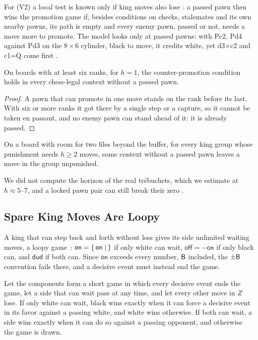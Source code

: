 For (V2) a local test is known only if king moves also lose : a passed pawn then wins the promotion
game if, besides conditions on checks, stalemates and its own nearby pawns, its path is empty and every enemy
pawn, passed or not, needs a move more to promote. The model looks only at passed pawns: with Pc2, Pd4 against
Pd3 on the $8\times6$ cylinder, black to move, it credits white, yet d3$\times$c2 and c1=Q come first .

\begin{proposition}[\lab{S}]\label{prop:horizon1}
On boards with at least six ranks, for $h=1$, the counter-promotion condition holds in every chess-legal
context without a passed pawn.
\end{proposition}

\begin{proof}
A pawn that can promote in one move stands on the rank before its last. With six or more ranks it got there by a
single step or a capture, so it cannot be taken en passant, and no enemy pawn can stand ahead of it: it is
already passed.
\end{proof}

\begin{conjecture}\label{conj:horizon2}
On a board with room for two files beyond the buffer, for every king group whose punishment needs $h\ge2$
moves, some context without a passed pawn leaves a move in the group unpunished.
\end{conjecture}

We did not compute the horizon of the real tr\'ebuchets, which we estimate at $h\approx5$--$7$, and a locked pawn pair can still break their zero .

\subsection{Spare King Moves Are Loopy}

A king that can step back and forth without loss gives its side unlimited waiting moves, a loopy
game~\cite{WinningWays,Siegel2013}: $\textsf{on}=\{\,\textsf{on} \mid \,\}$ if only white can wait,
$\textsf{off}=-\textsf{on}$ if only black can, and $\textsf{dud}$ if both can. Since $\textsf{on}$ exceeds every number, $\mathsf{B}$ included, the $\pm\mathsf{B}$ convention fails there, and a
decisive event must instead end the game.

\begin{theorem}\label{thm:loopy}
Let the components form a short game in which every decisive event ends the game, let a side that can wait pass
at any time, and let every other move in $Z$ lose. If only white can wait, black wins exactly when it can force a decisive
event in its favor against a passing white, and white wins otherwise. If both can wait, a side wins exactly when
it can do so against a passing opponent, and otherwise the game is drawn.
\end{theorem}

